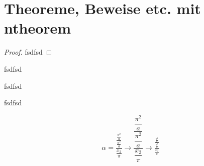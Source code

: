 \documentclass[12pt,ngerman,parskip=half]{scrartcl}
\begin{document}
\section{Theoreme, Beweise etc. mit ntheorem}


\begin{proof}
fsdfsd
\end{proof}

\begin{theorem}
fsdfsd
\end{theorem}

\begin{lemma}
fsdfsd
\end{lemma}

\begin{corollary}
fsdfsd
\end{corollary}


\begin{equation}
\alpha = \frac{\frac{\frac{\pi^2}{a}}{\frac{\pi^2}{a}}}{\frac{x_2}{\pi}}
\rightarrow
\dfrac{\dfrac{\dfrac{\pi^2}{a}}{\dfrac{\pi^2}{a}}}{\dfrac{x_2}{\pi}}
\rightarrow
\tfrac{\tfrac{\tfrac{\pi^2}{a}}{\tfrac{\pi^2}{a}}}{\tfrac{x_2}{\pi}}
\end{equation}
\end{document}
